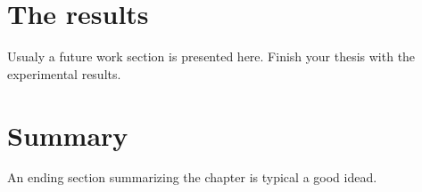 \section{The results}
Usualy a future work section is presented here.
Finish your thesis with the experimental results.

\section{Summary}

An ending section summarizing the chapter is typical a good idead.

\cleardoublepage
 
